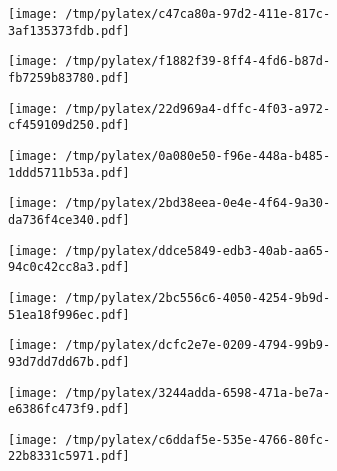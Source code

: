 \documentclass{article}
\begin{document}
\begin{figure}[htbp]
\begin{subfigure}[b]{.3\linewidth}
\texttt{[image: /tmp/pylatex/c47ca80a-97d2-411e-817c-3af135373fdb.pdf]}
\end{subfigure}
\begin{subfigure}[b]{.3\linewidth}
\texttt{[image: /tmp/pylatex/f1882f39-8ff4-4fd6-b87d-fb7259b83780.pdf]}
\end{subfigure}
\begin{subfigure}[b]{.3\linewidth}
\texttt{[image: /tmp/pylatex/22d969a4-dffc-4f03-a972-cf459109d250.pdf]}
\end{subfigure}
\begin{subfigure}[b]{.3\linewidth}
\texttt{[image: /tmp/pylatex/0a080e50-f96e-448a-b485-1ddd5711b53a.pdf]}
\end{subfigure}
\begin{subfigure}[b]{.3\linewidth}
\texttt{[image: /tmp/pylatex/2bd38eea-0e4e-4f64-9a30-da736f4ce340.pdf]}
\end{subfigure}
\begin{subfigure}[b]{.3\linewidth}
\texttt{[image: /tmp/pylatex/ddce5849-edb3-40ab-aa65-94c0c42cc8a3.pdf]}
\end{subfigure}
\begin{subfigure}[b]{.3\linewidth}
\texttt{[image: /tmp/pylatex/2bc556c6-4050-4254-9b9d-51ea18f996ec.pdf]}
\end{subfigure}
\begin{subfigure}[b]{.3\linewidth}
\texttt{[image: /tmp/pylatex/dcfc2e7e-0209-4794-99b9-93d7dd7dd67b.pdf]}
\end{subfigure}
\begin{subfigure}[b]{.3\linewidth}
\texttt{[image: /tmp/pylatex/3244adda-6598-471a-be7a-e6386fc473f9.pdf]}
\end{subfigure}
\begin{subfigure}[b]{.3\linewidth}
\texttt{[image: /tmp/pylatex/c6ddaf5e-535e-4766-80fc-22b8331c5971.pdf]}
\end{subfigure}
\end{figure}
\end{document}
